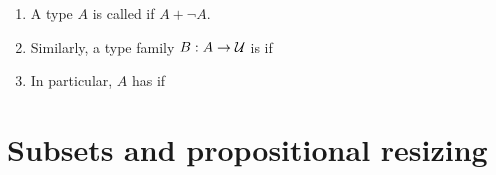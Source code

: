 \documentclass[hott-all.tex]{subfiles}
\begin{document}
\begin{defn}\label{defn:decidable-equality}
  \mbox{}
  \begin{enumerate}
  \item A type $A$ is called 
    if $A+\neg A$.
  \item Similarly, a type family $B:A\to \mathcal{U}$ is 
    if  \label{item:decidable-equality2}
  \item In particular, $A$ has 
    if 
  \end{enumerate}
\end{defn}
%
%

\section{Subsets and propositional resizing}
\label{subsec:prop-subsets}
%
%
%
\end{document}

